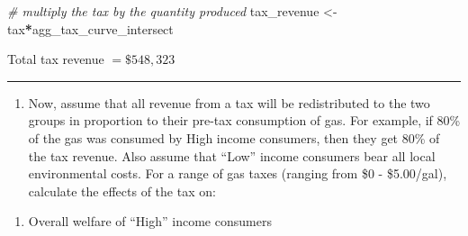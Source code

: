 \documentclass[]{article}
\newenvironment{Shaded}{\begin{snugshade}}{\end{snugshade}}
\newcommand{\CommentTok}[1]{\textcolor[rgb]{0.56,0.35,0.01}{\textit{#1}}}
\newcommand{\NormalTok}[1]{#1}
\newcommand{\OperatorTok}[1]{\textcolor[rgb]{0.81,0.36,0.00}{\textbf{#1}}}
\newcommand{\StringTok}[1]{\textcolor[rgb]{0.31,0.60,0.02}{#1}}
\providecommand{\tightlist}{%
  \setlength{\itemsep}{0pt}\setlength{\parskip}{0pt}}
\begin{document}
\begin{Shaded}
\begin{Highlighting}[]
\CommentTok{# multiply the tax by the quantity produced}
\NormalTok{tax_revenue <-}\StringTok{ }\NormalTok{tax}\OperatorTok{*}\NormalTok{agg_tax_curve_intersect}
\end{Highlighting}
\end{Shaded}

Total tax revenue \(=\$548,323\)

\begin{center}\rule{0.5\linewidth}{0.5pt}\end{center}

\begin{enumerate}
\def\labelenumi{\arabic{enumi}.}
\setcounter{enumi}{3}
\tightlist
\item
  Now, assume that all revenue from a tax will be redistributed to the
  two groups in proportion to their pre-tax consumption of gas. For
  example, if 80\% of the gas was consumed by High income consumers,
  then they get 80\% of the tax revenue. Also assume that ``Low'' income
  consumers bear all local environmental costs. For a range of gas taxes
  (ranging from \$0 - \$5.00/gal), calculate the effects of the tax on:
\end{enumerate}

\begin{enumerate}
\def\labelenumi{\alph{enumi}.}
\tightlist
\item
  Overall welfare of ``High'' income consumers
\end{enumerate}
\end{document}
